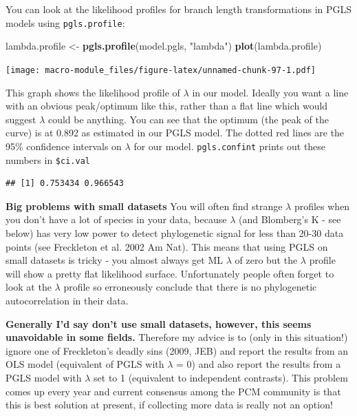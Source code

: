 \documentclass[]{book}
\newenvironment{Shaded}{\begin{snugshade}}{\end{snugshade}}
\newcommand{\KeywordTok}[1]{\textcolor[rgb]{0.13,0.29,0.53}{\textbf{{#1}}}}
\newcommand{\StringTok}[1]{\textcolor[rgb]{0.31,0.60,0.02}{{#1}}}
\newcommand{\NormalTok}[1]{{#1}}
\begin{document}
You can look at the likelihood profiles for branch length
transformations in PGLS models using \texttt{pgls.profile}:

\begin{Shaded}
\begin{Highlighting}[]
\NormalTok{lambda.profile <-}\StringTok{ }\KeywordTok{pgls.profile}\NormalTok{(model.pgls, }\StringTok{"lambda"}\NormalTok{)}
\KeywordTok{plot}\NormalTok{(lambda.profile)}
\end{Highlighting}
\end{Shaded}

\texttt{[image: macro-module\_files/figure-latex/unnamed-chunk-97-1.pdf]}

This graph shows the likelihood profile of \(\lambda\) in our model.
Ideally you want a line with an obvious peak/optimum like this, rather
than a flat line which would suggest \(\lambda\) could be anything. You
can see that the optimum (the peak of the curve) is at 0.892 as
estimated in our PGLS model. The dotted red lines are the 95\%
confidence intervals on \(\lambda\) for our model. \texttt{pgls.confint}
prints out these numbers in \texttt{\$ci.val}

\begin{Shaded}
\end{Shaded}

\begin{verbatim}
## [1] 0.753434 0.966543
\end{verbatim}

\textbf{Big problems with small datasets} You will often find strange
\(\lambda\) profiles when you don't have a lot of species in your data,
because \(\lambda\) (and Blomberg's K - see below) has very low power to
detect phylogenetic signal for less than 20-30 data points (see
Freckleton et al. 2002 Am Nat). This means that using PGLS on small
datasets is tricky - you almost always get ML \(\lambda\) of zero but
the \(\lambda\) profile will show a pretty flat likelihood surface.
Unfortunately people often forget to look at the \(\lambda\) profile so
erroneously conclude that there is no phylogenetic autocorrelation in
their data.

\textbf{Generally I'd say don't use small datasets, however, this seems
unavoidable in some fields.} Therefore my advice is to (only in this
situation!) ignore one of Freckleton's deadly sins (2009, JEB) and
report the results from an OLS model (equivalent of PGLS with
\(\lambda\) = 0) and also report the results from a PGLS model with
\(\lambda\) set to 1 (equivalent to independent contrasts). This problem
comes up every year and current consensus among the PCM community is
that this is best solution at present, if collecting more data is really
not an option!
\end{document}

